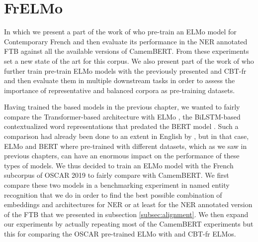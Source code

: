 \chapter{FrELMo}\label{chap:frelmo}

\begin{center}
    \begin{minipage}{0.66\textwidth}
        \begin{small}
            In which we present a part of the work of \citet{ortiz-suarez-etal-2020-establishing} who pre-train an ELMo model for Contemporary French and then evaluate its performance in the NER annotated FTB against all the available versions of CamemBERT. From these experiments \citet{ortiz-suarez-etal-2020-establishing} set a new state of the art for this corpus. We also present part of the work of \citet{popa-fabre-etal-2020-french} who further train pre-train ELMo models with the previously presented \Cabernet and CBT-fr and then evaluate them in multiple downstream tasks in order to assess the importance of representative and balanced corpora as pre-training datasets.\footnotemark
        \end{small}
    \end{minipage}
    \vspace{0.5cm}
\end{center}


Having trained the \roberta \citep{liu-etal-2019-roberta} based \camembert \citep{martin-etal-2020-camembert} models in the previous chapter, we wanted to fairly compare the Transformer-based architecture with ELMo \citep{peters-etal-2018-deep}, the BiLSTM-based contextualized word representations that predated the BERT model \citep{devlin-etal-2019-bert}. Such a comparison had already been done to an extent in English by \citet{peters-etal-2019-tune}, but in that case, ELMo and BERT where pre-trained with different datasets, which as we saw in previous chapters, can have an enormous impact on the performance of these types of models. We thus decided to train an ELMo model with the French subcorpus of OSCAR 2019 to fairly compare with CamemBERT. We first compare these two models in a benchmarking experiment in named entity recognition that we do in order to find the best possible combination of embeddings and architectures for NER or at least for the NER annotated version of the FTB that we presented in subsection \ref{subsec:alignment}. We then expand our experiments by actually repeating most of the CamemBERT experiments but this for comparing the OSCAR pre-trained ELMo with \Cabernet and CBT-fr ELMos.

